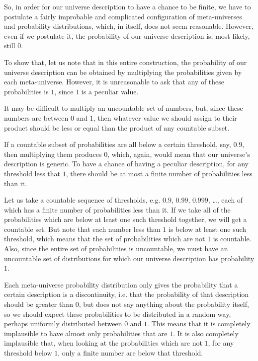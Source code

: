 \documentclass[a4paper
,draft
]{article}
\begin{document}
So, in order for our universe description to have a chance to be finite,
we have to postulate a fairly improbable and complicated configuration
of meta-universes and probability distributions, which,
in itself, does not seem reasonable.
However, even if we postulate it, the probability of our universe description
is, most likely, still $0$.

To show that, let us note that in this entire construction,
the probability of our universe description can be obtained by multiplying the
probabilities given by each meta-universe. However, it is unreasonable
to ask that any of these probabilities is $1$, since $1$ is a peculiar value.

It may be difficult to multiply an uncountable set of numbers, but,
since these numbers are between $0$ and $1$, then whatever value we should
assign to their product
should be less or equal than the product of any countable subset.

If a countable subset of probabilities are all below a certain threshold,
say, $0.9$, then multiplying them produces $0$, which, again, would mean
that our universe's description is generic. To have a chance of having
a peculiar description, for any threshold less that $1$, there should be at
most a finite number of probabilities less than it.

Let us take a countable sequence of thresholds, e.g.
$0.9$, $0.99$, $0.999$, \dots, each of which has a finite number of
probabilities less than it.
If we take all of the probabilities which are below at least
one such threshold together, we will get a countable set.
But note that each number less than $1$ is below at least one such threshold,
which means that the set of
probabilities which are not $1$ is countable.
Also, since the entire set of
probabilities is uncountable, we must have an uncountable set of distributions
for which our universe description has probability $1$.

Each meta-universe probability distribution only gives the
probability that a certain description is a discontinuity, i.e. that
the probability of that description should be greater than $0$, but does not say
anything about the probability itself,
so we should expect these probabilities to
be distributed in a random way, perhaps uniformly distributed between $0$ and
$1$.
This means that it is completely implausible to have almost only
probabilities that are $1$.
It is also completely implausible that, when looking at the
probabilities which are not $1$, for any threshold below $1$, only a finite
number are below that threshold.
\end{document}
